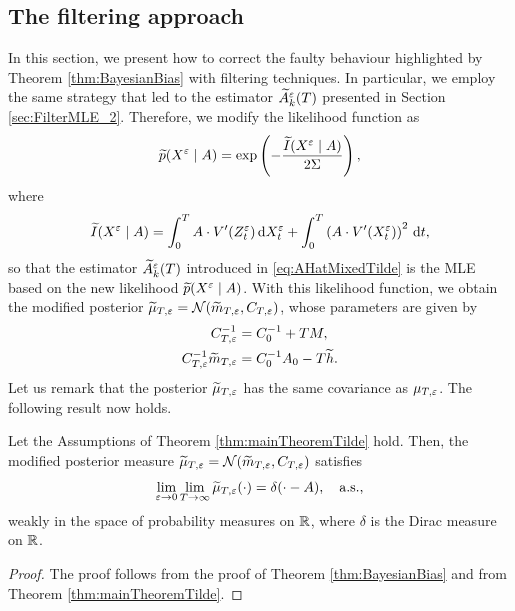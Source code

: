\documentclass[10pt]{article}
\begin{document}
\subsection{The filtering approach}\label{sec:BayesianFilter}

In this section, we present how to correct the faulty behaviour highlighted by Theorem \ref{thm:BayesianBias} with filtering techniques. In particular, we employ the same strategy that led to the estimator $\widetilde A^\varepsilon_k(T)$ presented in Section \ref{sec:FilterMLE_2}. Therefore, we modify the likelihood function as
\begin{equation}
	\widetilde p(X^\varepsilon \mid A) = \exp\left(-\frac{\widetilde I(X^\varepsilon\mid A)}{2\Sigma} \right), 
\end{equation}
where 
\begin{equation}
	\widetilde I(X^\varepsilon \mid A) =\int_0^T A \cdot V'(Z^\varepsilon_t) \,\mathrm{d} X^\varepsilon_t + \int_0^T \left(A \cdot V'(X^\varepsilon_t)\right)^2 \,\mathrm{d} t,
\end{equation}
so that the estimator $\widetilde A^\varepsilon_k(T)$ introduced in \eqref{eq:AHatMixedTilde} is the MLE based on the new likelihood $\widetilde p(X^\varepsilon \mid A)$. With this likelihood function, we obtain the modified posterior $\widetilde \mu_{T,\varepsilon} = \mathcal N(\widetilde m_{T, \varepsilon}, C_{T, \varepsilon})$, whose parameters are given by
\begin{equation}
\begin{aligned}
	C_{T, \varepsilon}^{-1} &= C_0^{-1} + T M, \\
	C_{T,\varepsilon}^{-1}\widetilde m_{T,\varepsilon} &= C_0^{-1}A_0 - T \widetilde h. 
\end{aligned}	
\end{equation}
Let us remark that the posterior $\widetilde \mu_{T,\varepsilon}$ has the same covariance as $\mu_{T,\varepsilon}$. The following result now holds.
\begin{theorem} Let the Assumptions of Theorem \ref{thm:mainTheoremTilde} hold. Then, the modified posterior measure $\widetilde\mu_{T,\varepsilon} = \mathcal N(\widetilde m_{T,\varepsilon}, C_{T,\varepsilon})$ satisfies
	\begin{equation}
	\lim_{\varepsilon \to 0}\lim_{T \to \infty} \widetilde \mu_{T,\varepsilon}(\cdot) = \delta(\cdot - A), \quad \text{a.s.},
	\end{equation}
	weakly in the space of probability measures on $\mathbb{R}$, where $\delta$ is the Dirac measure on $\mathbb{R}$.
\end{theorem}
\begin{proof} The proof follows from the proof of Theorem \ref{thm:BayesianBias} and from Theorem \ref{thm:mainTheoremTilde}.
\end{proof}
\end{document}
